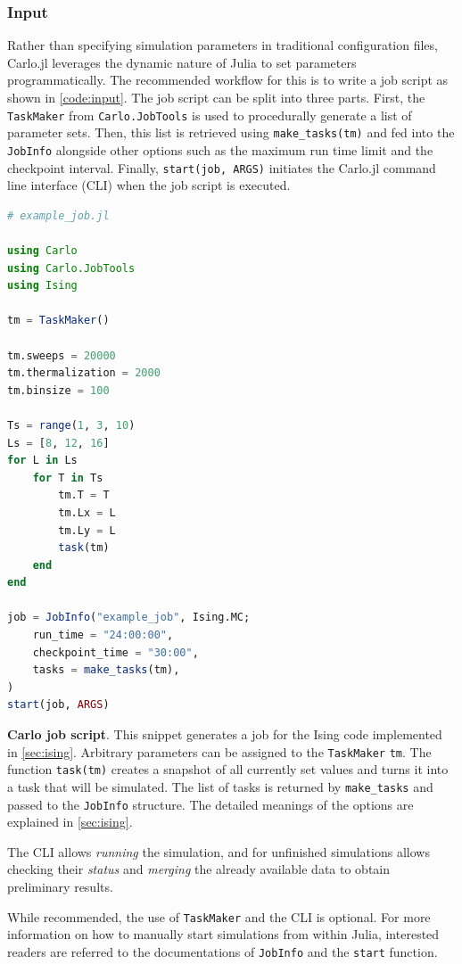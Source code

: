 \documentclass{SciPost}
\begin{document}
\subsubsection{Input}
Rather than specifying simulation parameters in traditional configuration files, Carlo.jl leverages the dynamic nature of Julia to set parameters programmatically. The recommended workflow for this is to write a job script as shown in \cref{code:input}. The job script can be split into three parts. First, the \texttt{TaskMaker} from \texttt{Carlo.JobTools} is used to procedurally generate a list of parameter sets. Then, this list is retrieved using \texttt{make\_{}tasks(tm)} and fed into the \texttt{JobInfo} alongside other options such as the maximum run time limit and the checkpoint interval. Finally, \texttt{start(job, ARGS)} initiates the Carlo.jl command line interface (CLI) when the job script is executed.
\begin{lstfloat}
\begin{lstlisting}[language=julia]
# example_job.jl

using Carlo
using Carlo.JobTools
using Ising

tm = TaskMaker()

tm.sweeps = 20000
tm.thermalization = 2000
tm.binsize = 100

Ts = range(1, 3, 10)
Ls = [8, 12, 16]
for L in Ls
    for T in Ts
        tm.T = T
        tm.Lx = L
        tm.Ly = L
        task(tm)
    end
end

job = JobInfo("example_job", Ising.MC;
    run_time = "24:00:00",
    checkpoint_time = "30:00",
    tasks = make_tasks(tm),
)
start(job, ARGS)
\end{lstlisting}
\caption{\textbf{Carlo job script}. This snippet generates a job for the Ising code implemented in \cref{sec:ising}. Arbitrary parameters can be assigned to the \texttt{TaskMaker} \texttt{tm}. The function \texttt{task(tm)} creates a snapshot of all currently set values and turns it into a task that will be simulated. The list of tasks is returned by \texttt{make\_{}tasks} and passed to the \texttt{JobInfo} structure. The detailed meanings of the options are explained in \cref{sec:ising}.}
\label{code:input}
\end{lstfloat}
The CLI allows \textit{running} the simulation, and for unfinished simulations allows checking their \textit{status} and \textit{merging} the already available data to obtain preliminary results. 

While recommended, the use of \texttt{TaskMaker} and the CLI is optional. For more information on how to manually start simulations from within Julia, interested readers are referred to the documentations of \texttt{JobInfo} and the \texttt{start} function.
\end{document}
